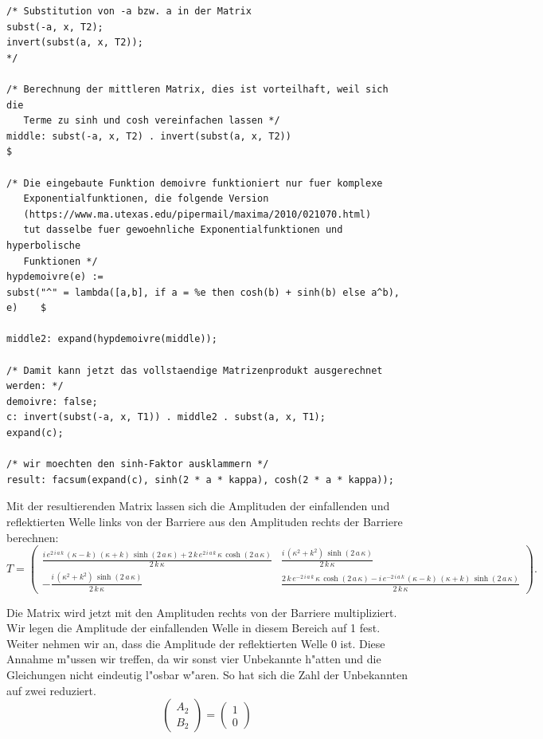 \begin{refsection}
\begin{lstlisting}[style=Maxima]
/* Substitution von -a bzw. a in der Matrix
subst(-a, x, T2);
invert(subst(a, x, T2));
*/

/* Berechnung der mittleren Matrix, dies ist vorteilhaft, weil sich die
   Terme zu sinh und cosh vereinfachen lassen */
middle: subst(-a, x, T2) . invert(subst(a, x, T2))                          $

/* Die eingebaute Funktion demoivre funktioniert nur fuer komplexe
   Exponentialfunktionen, die folgende Version
   (https://www.ma.utexas.edu/pipermail/maxima/2010/021070.html)
   tut dasselbe fuer gewoehnliche Exponentialfunktionen und hyperbolische
   Funktionen */
hypdemoivre(e) :=
subst("^" = lambda([a,b], if a = %e then cosh(b) + sinh(b) else a^b), e)    $

middle2: expand(hypdemoivre(middle));

/* Damit kann jetzt das vollstaendige Matrizenprodukt ausgerechnet werden: */
demoivre: false;
c: invert(subst(-a, x, T1)) . middle2 . subst(a, x, T1);
expand(c);

/* wir moechten den sinh-Faktor ausklammern */
result: facsum(expand(c), sinh(2 * a * kappa), cosh(2 * a * kappa));

\end{lstlisting}

Mit der resultierenden Matrix lassen sich die Amplituden der einfallenden und reflektierten Welle links von der Barriere aus den Amplituden rechts der Barriere berechnen:
\[
T =
\begin{pmatrix}
\frac{i\,e^{2\,i\,a\,k}\,\left(\kappa-k\right)\,\left(\kappa+k
 \right)\,\sinh \left(2\,a\,\kappa\right)+2\,k\,e^{2\,i\,a\,k}\,
 \kappa\,\cosh \left(2\,a\,\kappa\right)}{2\,k\,\kappa}
&
\frac{i\,
 \left(\kappa^2+k^2\right)\,\sinh \left(2\,a\,\kappa\right)}{2\,
 k\,\kappa}
\\
-\frac{i\,\left(\kappa^2+k^2\right)\,\sinh \left(2\,a\,
 \kappa\right)}{2\,k\,\kappa}
&
\frac{2\,k\,e^ {- 2\,i\,a\,k }\,
 \kappa\,\cosh \left(2\,a\,\kappa\right)-i\,e^ {- 2\,i\,a\,k }\,
 \left(\kappa-k\right)\,\left(\kappa+k\right)\,\sinh \left(2\,a\,
 \kappa\right)}{2\,k\,\kappa}
\end{pmatrix}.
\]

Die Matrix wird jetzt mit den Amplituden rechts von der Barriere multipliziert. 
Wir legen die Amplitude der einfallenden Welle in diesem Bereich auf 1 fest. 
Weiter nehmen wir an, dass die Amplitude der reflektierten Welle 0 ist.
Diese Annahme m"ussen wir treffen, da wir sonst vier Unbekannte h"atten und die Gleichungen nicht eindeutig l"osbar w"aren.
So hat sich die Zahl der Unbekannten auf zwei reduziert.
\[
\begin{pmatrix}
A_2
\\
B_2
\end{pmatrix}
=
\begin{pmatrix}
1
\\
0
\end{pmatrix}
\]


\end{refsection}
